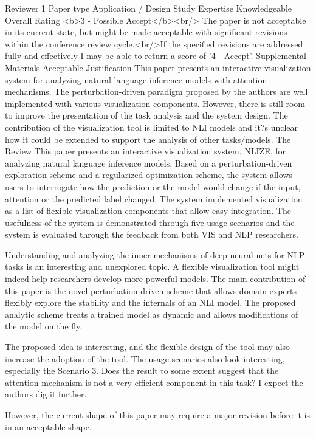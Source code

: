 Reviewer 1
Paper type
Application / Design Study
Expertise
Knowledgeable
Overall Rating
<b>3 - Possible Accept</b><br/> The paper is not acceptable in its current state, but might be made acceptable with significant revisions within the conference review cycle.<br/>If the specified revisions are addressed fully and effectively I may be able to return a score of '4 - Accept'.
Supplemental Materials
Acceptable
Justification
This paper presents an interactive visualization system for analyzing natural language inference models with attention mechanisms. The perturbation-driven paradigm proposed by the authors are well implemented with various visualization components. However, there is still room to improve the presentation of the task analysis and the system design. The contribution of the visualization tool is limited to NLI models and it?s unclear how it could be extended to support the analysis of other tasks/models.
The Review
This paper presents an interactive visualization system, NLIZE, for analyzing natural language inference models. Based on a perturbation-driven exploration scheme and a regularized optimization scheme, the system allows users to interrogate how the prediction or the model would change if the input, attention or the predicted label changed. The system implemented visualization as a list of flexible visualization components that allow easy integration. The usefulness of the system is demonstrated through five usage scenarios and the system is evaluated through the feedback from both VIS and NLP researchers. 

Understanding and analyzing the inner mechanisms of deep neural nets for NLP tasks is an interesting and unexplored topic. A flexible visualization tool might indeed help researchers develop more powerful models. The main contribution of this paper is the novel perturbation-driven scheme that allows domain experts flexibly explore the stability and the internals of an NLI model. The proposed analytic scheme treats a trained model as dynamic and allows modifications of the model on the fly. 

The proposed idea is interesting, and the flexible design of the tool may also increase the adoption of the tool. The usage scenarios also look interesting, especially the Scenario 3. Does the result to some extent suggest that the attention mechanism is not a very efficient component in this task? I expect the authors dig it further.

However, the current shape of this paper may require a major revision before it is in an acceptable shape.

